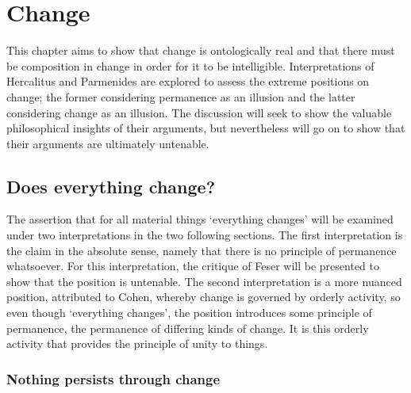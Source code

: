 \chapter{Change}
\label{ch:change}


This chapter aims to show that change is ontologically real and that there must be composition in change in order for it to be intelligible. Interpretations of Hercalitus and Parmenides are explored to assess the extreme positions on change; the former considering permanence as an illusion and the latter considering change as an illusion. The discussion will seek to show the valuable philosophical insights of their arguments, but nevertheless will go on to show that their arguments are ultimately untenable.

\section{Does everything change?}

The assertion that for all material things `everything changes' will be examined under two interpretations in the two following sections. The first interpretation is the claim in the absolute sense, namely that there is no principle of permanence whatsoever. For this interpretation, the critique of Feser will be presented to show that the position is untenable. The second interpretation is a more nuanced position, attributed to Cohen, whereby change is governed by orderly activity, so even though `everything changes', the position introduces some principle of permanence, the permanence of differing kinds of change. It is this orderly activity that provides the principle of unity to things.

\subsection{Nothing persists through change}

